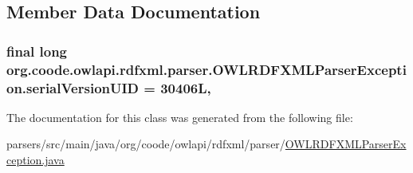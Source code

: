 \subsection{Member Data Documentation}
\hypertarget{classorg_1_1coode_1_1owlapi_1_1rdfxml_1_1parser_1_1_o_w_l_r_d_f_x_m_l_parser_exception_abecb83e6198c1d7c25f0bf712c8edeeb}{
\subsubsection[{serial\-Version\-U\-I\-D}]{\setlength{\rightskip}{0pt plus 5cm}final long org.\-coode.\-owlapi.\-rdfxml.\-parser.\-O\-W\-L\-R\-D\-F\-X\-M\-L\-Parser\-Exception.\-serial\-Version\-U\-I\-D = 30406\-L\hspace{0.3cm}{\ttfamily [static]}, {\ttfamily [private]}}}\label{classorg_1_1coode_1_1owlapi_1_1rdfxml_1_1parser_1_1_o_w_l_r_d_f_x_m_l_parser_exception_abecb83e6198c1d7c25f0bf712c8edeeb}


The documentation for this class was generated from the following file\-:\begin{DoxyCompactItemize}
\item 
parsers/src/main/java/org/coode/owlapi/rdfxml/parser/\hyperlink{_o_w_l_r_d_f_x_m_l_parser_exception_8java}{O\-W\-L\-R\-D\-F\-X\-M\-L\-Parser\-Exception.\-java}\end{DoxyCompactItemize}
